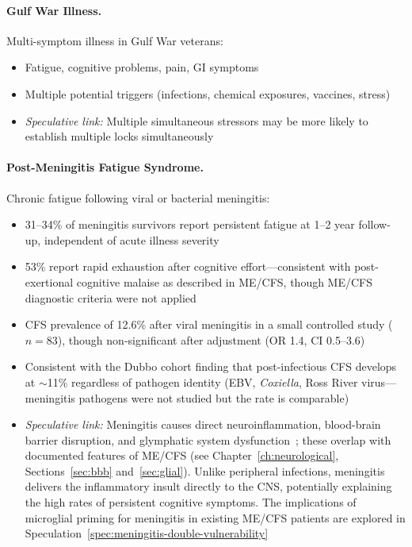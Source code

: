 \paragraph{Gulf War Illness.} Multi-symptom illness in Gulf War veterans:
\begin{itemize}
    \item Fatigue, cognitive problems, pain, GI symptoms
    \item Multiple potential triggers (infections, chemical exposures, vaccines, stress)
    \item \textit{Speculative link:} Multiple simultaneous stressors may be more likely to establish multiple locks simultaneously
\end{itemize}

\paragraph{Post-Meningitis Fatigue Syndrome.} Chronic fatigue following viral or bacterial meningitis:
\begin{itemize}
    \item 31--34\% of meningitis survivors report persistent fatigue at 1--2 year follow-up, independent of acute illness severity~\cite{Schwitter2024meningitis,Ungureanu2021meningitis}
    \item 53\% report rapid exhaustion after cognitive effort---consistent with post-exertional cognitive malaise as described in ME/CFS, though ME/CFS diagnostic criteria were not applied~\cite{Schwitter2024meningitis}
    \item CFS prevalence of 12.6\% after viral meningitis in a small controlled study ($n=83$), though non-significant after adjustment (OR 1.4, CI 0.5--3.6)~\cite{Hotopf1996meningitis}
    \item Consistent with the Dubbo cohort finding that post-infectious CFS develops at $\sim$11\% regardless of pathogen identity (EBV, \textit{Coxiella}, Ross River virus---meningitis pathogens were not studied but the rate is comparable)~\cite{Hickie2006postinfectious}
    \item \textit{Speculative link:} Meningitis causes direct neuroinflammation, blood-brain barrier disruption, and glymphatic system dysfunction~\cite{Pinas2022glymphatic}; these overlap with documented features of ME/CFS (see Chapter~\ref{ch:neurological}, Sections~\ref{sec:bbb} and~\ref{sec:glial}). Unlike peripheral infections, meningitis delivers the inflammatory insult directly to the CNS, potentially explaining the high rates of persistent cognitive symptoms. The implications of microglial priming for meningitis in existing ME/CFS patients are explored in Speculation~\ref{spec:meningitis-double-vulnerability}
\end{itemize}

